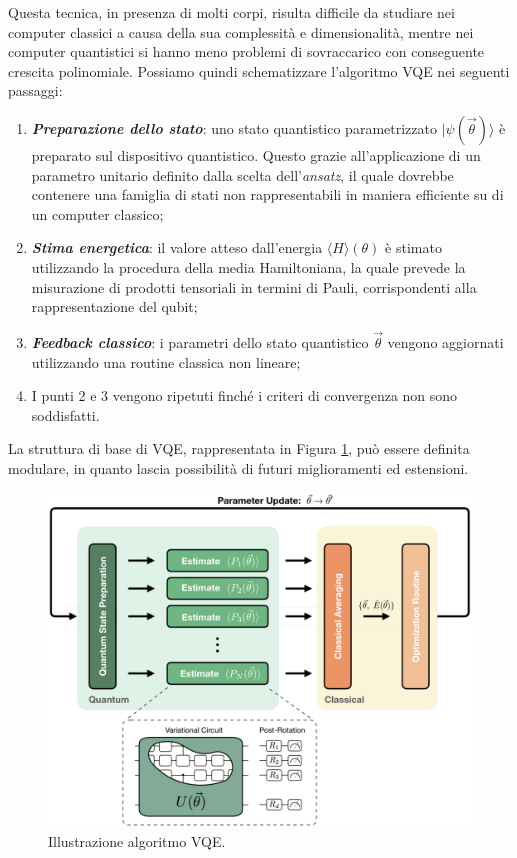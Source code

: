 Questa tecnica, in presenza di molti corpi, risulta difficile da studiare nei computer classici a causa della sua complessità e dimensionalità, mentre nei computer quantistici si hanno meno problemi di sovraccarico con conseguente crescita polinomiale.
Possiamo quindi schematizzare l'algoritmo VQE \cite{chimica_quantistica} nei seguenti passaggi:
\begin{enumerate}
    \item \textbf{\textit{Preparazione dello stato}}: uno stato quantistico parametrizzato $|\psi(\Vec{\theta})\rangle$ è preparato sul dispositivo quantistico. Questo grazie all'applicazione di un parametro unitario definito dalla scelta dell'\textit{ansatz}, il quale dovrebbe contenere una famiglia di stati non rappresentabili in maniera efficiente su di un computer classico;
    \item \textbf{\textit{Stima energetica}}: il valore atteso dall'energia $\langle H\rangle(\theta)$ è stimato utilizzando la procedura della media Hamiltoniana, la quale prevede la misurazione di prodotti tensoriali in termini di Pauli, corrispondenti alla rappresentazione del qubit;
    \item \textbf{\textit{Feedback classico}}: i parametri dello stato quantistico $\Vec{\theta}$ vengono aggiornati utilizzando una routine classica non lineare;
    \item I punti 2 e 3 vengono ripetuti finché i criteri di convergenza non sono soddisfatti.
\end{enumerate}

La struttura di base di VQE, rappresentata in Figura \ref{fig:struttura_vqe}, può essere definita modulare, in quanto lascia possibilità di futuri miglioramenti ed estensioni.
\begin{figure}[htp]
    \centering
    \includegraphics[width=\textwidth]{Images/Capitolo2/struttura_vqe.png}
    \caption{Illustrazione algoritmo VQE.}
    \label{fig:struttura_vqe}
\end{figure}
\newline\newline

